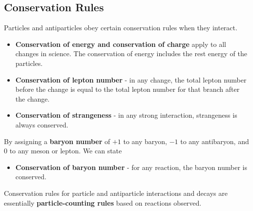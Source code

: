 \subsection{Conservation Rules}

Particles and antiparticles obey certain conservation rules when they interact.
\begin{itemize}
    \item \textbf{Conservation of energy and conservation of charge} apply to all changes in science. The conservation of energy includes the rest energy of the particles.
    \item \textbf{Conservation of lepton number} - in any change, the total lepton number before the change is equal to the total lepton number for that branch after the change.
    \item \textbf{Conservation of strangeness} - in any strong interaction, strangeness is always conserved.
\end{itemize}
By assigning a \textbf{baryon number} of $+1$ to any baryon, $-1$ to any antibaryon, and 0 to any meson or lepton. We can state
\begin{itemize}
    \item \textbf{Conservation of baryon number} - for any reaction, the baryon number is conserved.
\end{itemize}
Conservation rules for particle and antiparticle interactions and decays are essentially \textbf{particle-counting rules} based on reactions observed.
